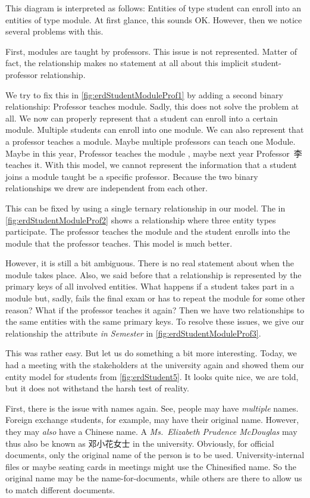 This diagram is interpreted as follows:
Entities of type student can enroll into an entities of type module.
At first glance, this sounds OK.
However, then we notice several problems with this.

First, modules are taught by professors.
This issue is not represented.
Matter of fact, the relationship makes no statement at all about this implicit student-professor relationship.

We try to fix this in \cref{fig:erdStudentModuleProf1} by adding a second binary relationship:
Professor teaches module.
Sadly, this does not solve the problem at all.
We now can properly represent that a student can enroll into a certain module.
Multiple students can enroll into one module.
We can also represent that a professor teaches a module.
Maybe multiple professors can teach one Module.
Maybe in this year, Professor \citeauthor{databases} teaches the module , maybe next year Professor~李 teaches it.
With this model, we cannot represent the information that a student joins a module taught be a specific professor.
Because the two binary relationships we drew are independent from each other.

This can be fixed by using a single ternary relationship in our model.
The  in \cref{fig:erdStudentModuleProf2} shows a relationship where three entity types participate.
The professor teaches the module and the student enrolls into the module that the professor teaches.
This model is much better.

However, it is still a bit ambiguous.
There is no real statement about when the module takes place.
Also, we said before that a relationship is represented by the primary keys of all involved entities.
What happens if a student takes part in a module but, sadly, fails the final exam or has to repeat the module for some other reason?
What if the professor teaches it again?
Then we have two relationships to the same entities with the same primary keys.
To resolve these issues, we give our relationship the attribute \emph{in Semester} in \cref{fig:erdStudentModuleProf3}.

This was rather easy.
But let us do something a bit more interesting.
Today, we had a meeting with the stakeholders at the university again and showed them our entity model for students from \cref{fig:erdStudent5}.
It looks quite nice, we are told, but it does not withstand the harsh test of reality.

First, there is the issue with names again.
See, people may have \emph{multiple} names.
Foreign exchange students, for example, may have their original name.
However, they may \emph{also} have a Chinese name.
A \emph{Ms.~Elizabeth Prudence McDouglas} may thus also be known as 邓小花女士 in the university.
Obviously, for official documents, only the original name of the person is to be used.
University-internal files or maybe seating cards in meetings might use the Chinesified name.
So the original name may be the name-for-documents, while others are there to allow us to match different documents.

